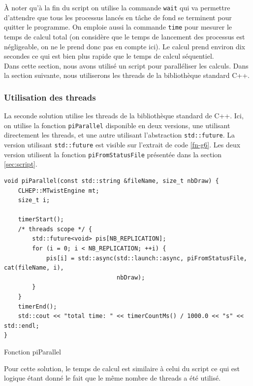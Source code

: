 \documentclass[a4paper]{article}
\begin{document}
À noter qu'à la fin du script on utilise la commande \texttt{wait} qui va
permettre d'attendre que tous les processus lancés en tâche de fond se terminent
pour quitter le programme. On emploie aussi la commande \texttt{time} pour
mesurer le temps de calcul total (on considère que le temps de lancement des
processus est négligeable, on ne le prend donc pas en compte ici). Le calcul
prend environ dix secondes ce qui est bien plus rapide que le temps de calcul
séquentiel.\\

Dans cette section, nous avons utilisé un script pour paralléliser les calculs.
Dans la section suivante, nous utiliserons les threads de la bibliothèque
standard C++.

\subsubsection{Utilisation des threads}

La seconde solution utilise les threads de la bibliothèque standard de C++. Ici,
on utilise la fonction \texttt{piParallel} disponible en deux versions, une
utilisant directement les threads, et une autre utilisant l'abstraction
\texttt{std::future}. La version utilisant \texttt{std::future} est visible sur
l'extrait de code \ref{fn-g6}. Les deux version utilisent la fonction
\texttt{piFromStatusFile} présentée dans la section \ref{sec:script}.

\begin{listing}[ht!]
\begin{verbatim}
void piParallel(const std::string &fileName, size_t nbDraw) {
    CLHEP::MTwistEngine mt;
    size_t i;

    timerStart();
    /* threads scope */ {
        std::future<void> pis[NB_REPLICATION];
        for (i = 0; i < NB_REPLICATION; ++i) {
            pis[i] = std::async(std::launch::async, piFromStatusFile, cat(fileName, i),
                                nbDraw);
        }
    }
    timerEnd();
    std::cout << "total time: " << timerCountMs() / 1000.0 << "s" << std::endl;
}
\end{verbatim}
\caption{Fonction piParallel}
\label{fn-q6}
\end{listing}

Pour cette solution, le temps de calcul est similaire à celui du script ce qui
est logique étant donné le fait que le même nombre de threads a été utilisé.
\end{document}
